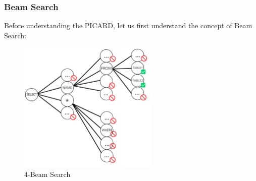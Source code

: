 


\subsubsection*{Beam Search}
Before understanding the PICARD, let us first understand the concept of Beam Search:

\begin{figure}[H]
    \centering
    \includegraphics[width=0.6\textwidth]{pics/picard/beam.png}
    \caption{4-Beam Search}
    \label{fig:beam_search}
\end{figure}


